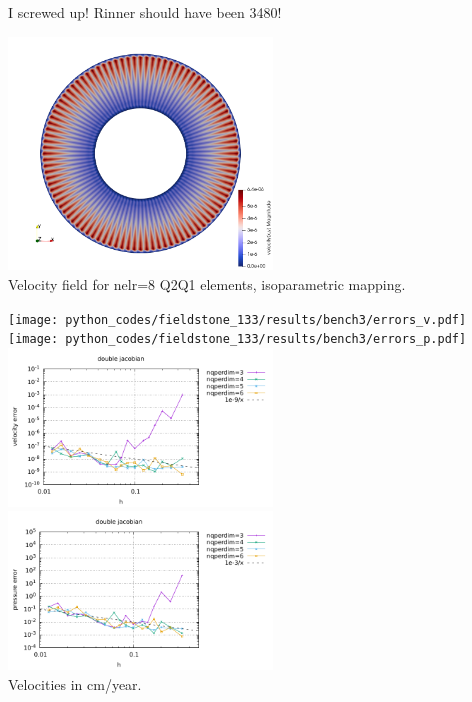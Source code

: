 I screwed up! Rinner should have been 3480!

\begin{center}
\includegraphics[width=7cm]{python_codes/fieldstone_133/results/bench3/vel}\\
{\captionfont  Velocity field for nelr=8 Q2Q1 elements, isoparametric mapping.}
\end{center}


\begin{center}
\texttt{[image: python\_codes/fieldstone\_133/results/bench3/errors\_v.pdf]}
\texttt{[image: python\_codes/fieldstone\_133/results/bench3/errors\_p.pdf]}\\
\includegraphics[width=7cm]{python_codes/fieldstone_133/results/bench3/DJ/errors_v.pdf}
\includegraphics[width=7cm]{python_codes/fieldstone_133/results/bench3/DJ/errors_p.pdf}\\
{\captionfont Velocities in cm/year.}
\end{center}



